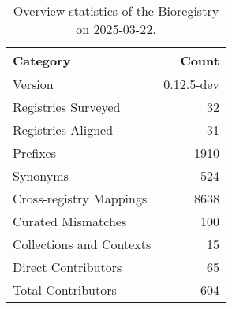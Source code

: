\begin{table}
\caption{Overview statistics of the Bioregistry on 2025-03-22.}
\label{tab:bioregistry-summary}
\begin{tabular}{lr}
\toprule
Category & Count \\
\midrule
Version & 0.12.5-dev \\
Registries Surveyed & 32 \\
Registries Aligned & 31 \\
Prefixes & 1910 \\
Synonyms & 524 \\
Cross-registry Mappings & 8638 \\
Curated Mismatches & 100 \\
Collections and Contexts & 15 \\
Direct Contributors & 65 \\
Total Contributors & 604 \\
\bottomrule
\end{tabular}
\end{table}
